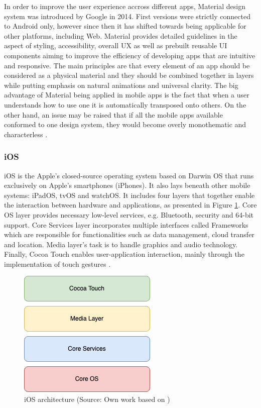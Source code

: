 In order to improve the user experience accross different apps, Material design system was introduced by Google in 2014. First versions were strictly connected to Android only, however since then it has shifted towards being applicable for other platforms, including Web. Material provides detailed guidelines in the aspect of styling, accessibility, overall UX as well as prebuilt reusable UI components aiming to improve the efficiency of developing apps that are intuitive and responsive. The main principles are that every element of an app should be considered as a physical material and they should be combined together in layers while putting emphasis on natural animations and universal clarity. The big advantage of Material being applied in mobile apps is the fact that when a user understands how to use one it is automatically transposed onto others. On the other hand, an issue may be raised that if all the mobile apps available conformed to one design system, they would become overly monothematic and characterless \cite{material_design_get_started,material_design_pros_cons}.

\subsubsection{iOS}

iOS is the Apple's closed-source operating system based on Darwin OS that runs exclusively on Apple's smartphones (iPhones). It also lays beneath other mobile systems: iPadOS, tvOS and watchOS. It includes four layers that together enable the interaction between hardware and applications, as presented in Figure \ref{fig:ios_architecture}. Core OS layer provides necessary low-level services, e.g. Bluetooth, security and 64-bit support. Core Services layer incorporates multiple interfaces called Frameworks which are responsible for functionalities such as data management, cloud transfer and location. Media layer's task is to handle graphics and audio technology. Finally, Cocoa Touch enables user-application interaction, mainly through the implementation of touch gestures \cite{ios_architecture,mobile_os_survey}.

\begin{figure}[h]
  \centering
  \includegraphics[scale=0.73]{img/ios_architecture}
  \caption{iOS architecture (Source: Own work based on \cite{ios_architecture})}
  \label{fig:ios_architecture}
\end{figure}

